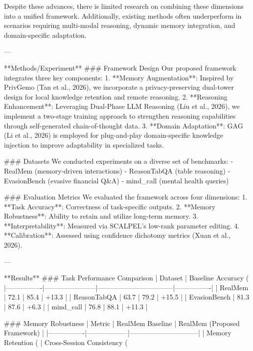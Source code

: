 Despite these advances, there is limited research on combining these dimensions into a unified framework. Additionally, existing methods often underperform in scenarios requiring multi-modal reasoning, dynamic memory integration, and domain-specific adaptation.

---

**Methods/Experiment**  
### Framework Design  
Our proposed framework integrates three key components:  
1. **Memory Augmentation**: Inspired by PrivGemo (Tan et al., 2026), we incorporate a privacy-preserving dual-tower design for local knowledge retention and remote reasoning.  
2. **Reasoning Enhancement**: Leveraging Dual-Phase LLM Reasoning (Liu et al., 2026), we implement a two-stage training approach to strengthen reasoning capabilities through self-generated chain-of-thought data.  
3. **Domain Adaptation**: GAG (Li et al., 2026) is employed for plug-and-play domain-specific knowledge injection to improve adaptability in specialized tasks.

### Datasets  
We conducted experiments on a diverse set of benchmarks:  
- RealMem (memory-driven interactions)  
- ReasonTabQA (table reasoning)  
- EvasionBench (evasive financial Q&A)  
- mind_call (mental health queries)

### Evaluation Metrics  
We evaluated the framework across four dimensions:  
1. **Task Accuracy**: Correctness of task-specific outputs.  
2. **Memory Robustness**: Ability to retain and utilize long-term memory.  
3. **Interpretability**: Measured via SCALPEL’s low-rank parameter editing.  
4. **Calibration**: Assessed using confidence dichotomy metrics (Xuan et al., 2026).

---

**Results**  
### Task Performance Comparison  
| Dataset        | Baseline Accuracy (%
|----------------|-----------------------|---------------------------------|----------------|  
| RealMem        | 72.1                 | 85.4                           | +13.3          |  
| ReasonTabQA    | 63.7                 | 79.2                           | +15.5          |  
| EvasionBench   | 81.3                 | 87.6                           | +6.3           |  
| mind_call      | 76.8                 | 88.1                           | +11.3          |  

### Memory Robustness  
| Metric         | RealMem Baseline | RealMem (Proposed Framework) |  
|----------------|------------------|------------------------------|  
| Memory Retention (%
| Cross-Session Consistency (%

